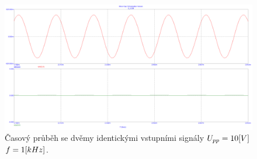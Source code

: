 \documentclass{article}
\begin{document}
\begin{figure}[H]
  \begin{minipage}[t]{\textwidth}
    \centering
    \includegraphics[width=\textwidth]{PC/ukol3/nula_vzstup.png}
    Časový průběh se dvěmy identickými vstupními signály \(U_{pp} = 10\-[V]\) \(f = 1\-[kHz]\).
  \end{minipage}
\end{figure}
\end{document}

